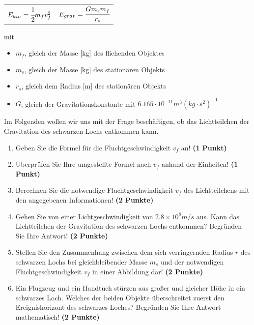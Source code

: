 \documentclass[a4paper, 9pt]{scrartcl}\usepackage[]{graphicx}\usepackage[]{xcolor}
\begin{document}
\begin{center}
  \begin{tabular}{cc}
    $E_{kin} = \cfrac{1}{2}m_fv_f^2$ & $E_{grav} = \cfrac{Gm_sm_f}{r_s}$\\
  \end{tabular}
\end{center}

mit

\begin{itemize}[noitemsep]
\item $m_f$, gleich der Masse [kg] des fliehenden Objektes
\item $m_s$, gleich der Masse [kg] des station{\"a}ren Objekts
\item $r_s$, gleich dem Radius [m] des station{\"a}ren Objekts  
\item $G$, gleich der Gravitationskonstante mit $6.165 \cdot 10^{-11}
  m^3(kg \cdot s^2)^{-1}$ 
\end{itemize}

Im Folgenden wollen wir uns mit der Frage besch{\"a}ftigen, ob das
Lichtteilchen der Gravitation des schwarzen Lochs entkommen kann.

\begin{enumerate}
\item Geben Sie die Formel f{\"u}r die Fluchtgeschwindigkeit $v_f$ an! 
  \textbf{(1 Punkt)}
\item {\"U}berpr{\"u}fen Sie Ihre umgestellte Formel nach $v_f$ anhand der Einheiten!
  \textbf{(1 Punkt)} 
\item Berechnen Sie die notwendige Fluchtgeschwindigkeit $v_f$ des
  Lichtteilchens mit den angegebenen Informationen! \textbf{(2 Punkte)}
\item Gehen Sie von einer Lichtgeschwindigkeit von $\ensuremath{2.8\times 10^{8}}m/s$
  aus. Kann das Lichtteilchen der Gravitation des schwarzen Lochs
  entkommen? Begr{\"u}nden Sie Ihre Antwort! \textbf{(2 Punkte)}
\item Stellen Sie den Zusammenhang zwischen dem sich verringernden Radius
  $r$ des schwarzen Lochs bei gleichbleibender Masse $m_s$
  und der notwendigen Fluchtgeschwindigkeit $v_f$ in einer Abbildung dar!
  \textbf{(2 Punkte)}
 \item Ein Flugzeug und ein Handtuch st{\"u}rzen aus gro{\ss}er und gleicher H{\"o}he
  in ein schwarzes Loch. Welches der beiden Objekte {\"u}berschreitet zuerst
  den Ereignishorizont des schwarzes Loches? Begr{\"u}nden
  Sie Ihre Antwort mathematisch! \textbf{(2 Punkte)}  
\end{enumerate}
\end{document}
